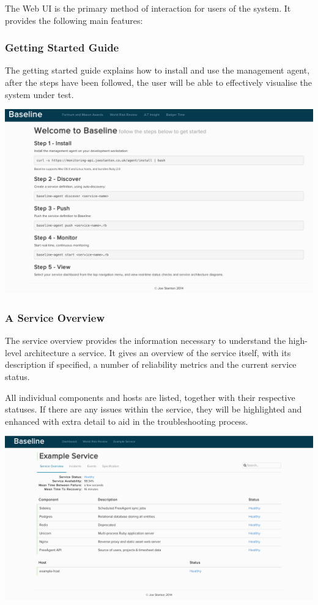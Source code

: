 \documentclass{cshonours}
\begin{document}
The Web UI is the primary method of interaction for users of the system. It provides the following main features:

\subsubsection{Getting Started Guide}

The getting started guide explains how to install and use the management agent, after the steps have been followed, the user will be able to effectively visualise the system under test.

\begin{center}
  \includegraphics[scale=0.28]{web-ui/getting-started.png}
\end{center}

\subsubsection{A Service Overview}

The service overview provides the information necessary to understand the high-level architecture a service. It gives an overview of the service itself, with its description if specified, a number of reliability metrics and the current service status.

All individual components and hosts are listed, together with their respective statuses. If there are any issues within the service, they will be highlighted and enhanced with extra detail to aid in the troubleshooting process.

\begin{center}
  \includegraphics[scale=0.28]{web-ui/service-overview.png}
\end{center}
\end{document}
